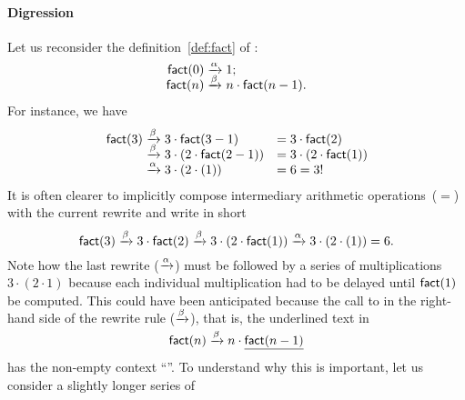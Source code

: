 \paragraph{Digression}

Let us reconsider the definition~\eqref{def:fact} of
 :
\begin{equation*}
\begin{array}{r@{\;}l@{\;}l}
\fun{fact}(0) & \smashedrightarrow{\alpha} & 1;\\
\fun{fact}(n) & \smashedrightarrow{\beta} & n \cdot \fun{fact}(n-1).
\end{array}
\end{equation*}
For instance, we have
\begin{equation*}
\begin{array}{r@{\;}c@{\;}lc@{\;}l}
\fun{fact}(3) & \xrightarrow{\beta} & 3 \cdot \fun{fact}(3-1)
              & = & 3 \cdot \fun{fact}(2)\\
              & \xrightarrow{\smash[t]{\beta}} &
              3 \cdot (2 \cdot \fun{fact}(2-1))
              & = & 3 \cdot (2 \cdot \fun{fact}(1))\\
              & \xrightarrow{\smash[t]{\alpha}} &
                3 \cdot (2 \cdot (1)) & = & 6 = 3!
\end{array}
\end{equation*}
It is often clearer to implicitly compose intermediary arithmetic
operations~(\(=\)) with the current rewrite and write in short
\begin{equation*}
\textsf{fact}(3) \xrightarrow{\beta} 3 \cdot \textsf{fact}(2)
\xrightarrow{\smash[t]{\beta}} 3 \cdot (2 \cdot \textsf{fact}(1))
\xrightarrow{\smash[t]{\alpha}} 3 \cdot (2 \cdot (1)) = 6.
\end{equation*}
Note how the last rewrite (\(\xrightarrow{\smash[t]{\alpha}}\)) must
be followed by a series of multiplications~\(3 \cdot (2 \cdot 1)\)
because each individual multiplication had to be delayed until
\(\textsf{fact}(1)\) be computed. This could have been anticipated
because the call to  in the right\hyp{}hand side of the
rewrite rule (\(\xrightarrow{\smash[t]{\beta}}\)), that is, the
underlined text in
\begin{equation*}
\textsf{fact}(n) \xrightarrow{\smash[t]{\beta}} n \cdot \underline{\textsf{fact}(n-1)}
\end{equation*}
has the non\hyp{}empty context
``''. To understand why this is
important, let us consider a slightly longer series of

